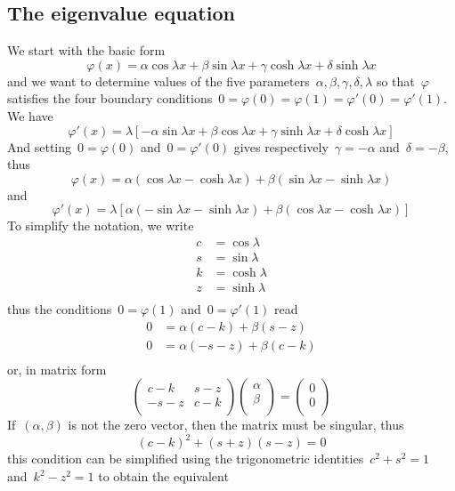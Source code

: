 \subsection{The eigenvalue equation}
We start with the basic form
$$
\varphi(x)=
\alpha\cos\lambda x
+\beta\sin\lambda x
+\gamma\cosh\lambda x
+\delta\sinh\lambda x
$$
and we want to determine values of the five
parameters~$\alpha,\beta,\gamma,\delta,\lambda$ so that~$\varphi$ satisfies
the four boundary conditions~$0=\varphi(0)=\varphi(1)=\varphi'(0)=\varphi'(1)$.
We have
$$
\varphi'(x)=\lambda\left[
	-\alpha\sin\lambda x
	+\beta\cos\lambda x
	+\gamma\sinh\lambda x
	+\delta\cosh\lambda x
\right]
$$
And setting~$0=\varphi(0)$ and~$0=\varphi'(0)$ gives
respectively~$\gamma=-\alpha$ and~$\delta=-\beta$, thus
$$
\varphi(x)=
	\alpha\left(\cos\lambda x-\cosh\lambda x\right)
	+
	\beta\left(\sin\lambda x-\sinh\lambda x\right)
$$
and
$$
\varphi'(x)=\lambda
\left[
	\alpha\left(-\sin\lambda x-\sinh\lambda x\right)
	+
	\beta\left(\cos\lambda x-\cosh\lambda x\right)
	\right]
$$
To simplify the notation, we write
\begin{eqnarray*}
	c &= \cos\lambda \\
	s &= \sin\lambda \\
	k &= \cosh\lambda \\
	z &= \sinh\lambda \\
\end{eqnarray*}
thus the conditions~$0=\varphi(1)$ and~$0=\varphi'(1)$ read
\begin{eqnarray*}
	0 &= \alpha(c-k)+\beta(s-z) \\
	0 &= \alpha(-s-z)+\beta(c-k) \\
\end{eqnarray*}
or, in matrix form
$$
\begin{pmatrix}
	c-k & s-z \\
	-s-z & c-k \\
\end{pmatrix}
\begin{pmatrix}
	\alpha \\
	\beta \\
\end{pmatrix}
=
\begin{pmatrix}
	0 \\
	0 \\
\end{pmatrix}
$$
If~$(\alpha,\beta)$ is not the zero vector, then the matrix must be singular,
thus
$$
(c-k)^2+(s+z)(s-z)=0
$$
this condition can be simplified using the trigonometric
identities~$c^2+s^2=1$ and~$k^2-z^2=1$ to obtain the equivalent
